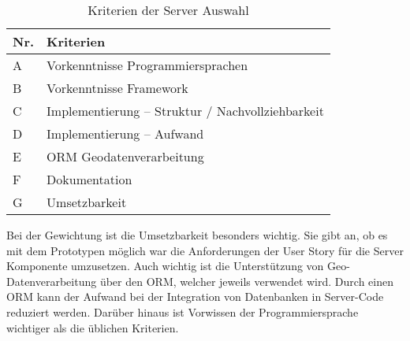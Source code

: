 \begin{table}[h]
	\caption{Kriterien der Server Auswahl}
	\begin{center}
		\begin{tabular}{ll}
			\toprule
			Nr. & Kriterien \\ \midrule
			A & Vorkenntnisse Programmiersprachen \\ 
			B & Vorkenntnisse Framework \\ 
			C & Implementierung – Struktur / Nachvollziehbarkeit \\ 
			D & Implementierung – Aufwand \\ 
			E & ORM Geodatenverarbeitung \\ 
			F & Dokumentation \\ 
			G & Umsetzbarkeit \\ \bottomrule
		\end{tabular}
	\end{center}
	\label{tab:server-kriterien}
\end{table}

Bei der Gewichtung ist die Umsetzbarkeit besonders wichtig.
Sie gibt an, ob es mit dem Prototypen möglich war die Anforderungen der User Story für die Server Komponente umzusetzen.
Auch wichtig ist die Unterstützung von Geo-Datenverarbeitung über den \ac{ORM}, welcher jeweils verwendet wird.
Durch einen \ac{ORM} kann der Aufwand bei der Integration von Datenbanken in Server-Code reduziert werden.
Darüber hinaus ist Vorwissen der Programmiersprache wichtiger als die üblichen Kriterien.

